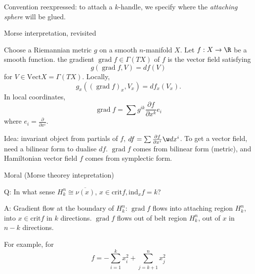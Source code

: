 \documentclass[a4paper]{article}
\DeclareMathOperator{\grad}{grad}
\begin{document}
Convention reexpressed: to attach a \(k\)-handle, we specify where the \emph{attaching sphere} will be glued.

Morse interpretation, revisited

\begin{definition}[gradient]
  Choose a Riemannian metric \(g\) on a smooth \(n\)-manifold \(X\). Let \(f: X \to \R\) be a smooth function. the gradient \(\grad f \in \Gamma(TX)\) of \(f\) is the vector field satisfying
  \[
    g(\grad f, V) = df(V)
  \]
  for \(V \in \text{Vect} X = \Gamma(TX)\).
  Locally,
  \[
    g_x((\grad f)_x, V_x) = df_x(V_x).
  \]
  In local coordinates,
  \[
    \grad f = \sum g^{ik} \frac{\partial f}{\partial x^k}e_i
  \]
  where \(e_i = \frac{\partial  }{\partial x^i}\).
\end{definition}

Idea: invariant object from partials of \(f\), \(df = \sum \frac{\partial f}{\partial x^i} \w dx^i\). To get a vector field, need a bilinear form to dualise \(df\). \(\grad f\) comes from bilinear form (metric), and Hamiltonian vector field \(f\) comes from symplectic form.

Moral (Morse theorey intepretation)

Q: In what sense \(H^n_k \cong \overline{\nu(x)}\), \(x \in \text{crit} f, \text{ind}_x f = k\)?

A: Gradient flow at the boundary of \(H^n_k\): \(\grad f\) flows into attaching region \(H^n_k\), into \(x \in \text{crit} f\) in \(k\) directions. \(\grad f\) flows out of belt region \(H^n_k\), out of \(x\) in \(n - k\) directions.

For example, for
\[
  f = - \sum_{i = 1}^k x_i^2 + \sum_{j = k + 1}^n x_j^2
\]












\printindex
\end{document}

